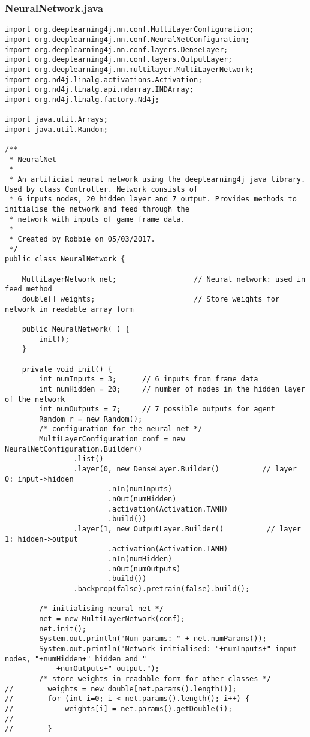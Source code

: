 \documentclass[12pt,a4paper]{article}
\begin{document}
\subsubsection{NeuralNetwork.java}
\begin{lstlisting}
import org.deeplearning4j.nn.conf.MultiLayerConfiguration;
import org.deeplearning4j.nn.conf.NeuralNetConfiguration;
import org.deeplearning4j.nn.conf.layers.DenseLayer;
import org.deeplearning4j.nn.conf.layers.OutputLayer;
import org.deeplearning4j.nn.multilayer.MultiLayerNetwork;
import org.nd4j.linalg.activations.Activation;
import org.nd4j.linalg.api.ndarray.INDArray;
import org.nd4j.linalg.factory.Nd4j;

import java.util.Arrays;
import java.util.Random;

/**
 * NeuralNet
 *
 * An artificial neural network using the deeplearning4j java library. Used by class Controller. Network consists of
 * 6 inputs nodes, 20 hidden layer and 7 output. Provides methods to initialise the network and feed through the
 * network with inputs of game frame data.
 *
 * Created by Robbie on 05/03/2017.
 */
public class NeuralNetwork {

    MultiLayerNetwork net;                  // Neural network: used in feed method
    double[] weights;                       // Store weights for network in readable array form

    public NeuralNetwork( ) {
        init();
    }

    private void init() {
        int numInputs = 3;      // 6 inputs from frame data
        int numHidden = 20;     // number of nodes in the hidden layer of the network
        int numOutputs = 7;     // 7 possible outputs for agent
        Random r = new Random();
        /* configuration for the neural net */
        MultiLayerConfiguration conf = new NeuralNetConfiguration.Builder()
                .list()
                .layer(0, new DenseLayer.Builder()          // layer 0: input->hidden
                        .nIn(numInputs)
                        .nOut(numHidden)
                        .activation(Activation.TANH)
                        .build())
                .layer(1, new OutputLayer.Builder()          // layer 1: hidden->output
                        .activation(Activation.TANH)
                        .nIn(numHidden)
                        .nOut(numOutputs)
                        .build())
                .backprop(false).pretrain(false).build();

        /* initialising neural net */
        net = new MultiLayerNetwork(conf);
        net.init();
        System.out.println("Num params: " + net.numParams());
        System.out.println("Network initialised: "+numInputs+" input nodes, "+numHidden+" hidden and "
            +numOutputs+" output.");
        /* store weights in readable form for other classes */
//        weights = new double[net.params().length()];
//        for (int i=0; i < net.params().length(); i++) {
//            weights[i] = net.params().getDouble(i);
//
//        }



\end{lstlisting}
\end{document}
